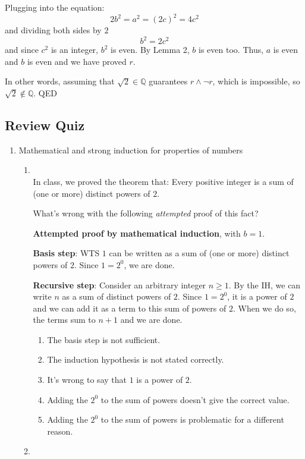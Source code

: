\documentclass[12pt, oneside]{article}
\begin{document}
Plugging into the equation:
\[
    2b^2 = a^2 = (2c)^2 = 4c^2
\]
and dividing both sides by $2$
\[
    b^2 = 2c^2
\]
and since $c^2$ is an integer, $b^2$ is even. By Lemma 2, $b$ is even too.
Thus, $a$ is even and $b$ is even and we have proved $r$. 

In other words, assuming that $\sqrt{2} \in \mathbb{Q}$ guarantees $r \land \lnot r$, 
which is impossible, so $\sqrt{2} \notin \mathbb{Q}$. QED

 

\newpage

\subsection*{Review Quiz}
\begin{enumerate}
    \item Mathematical and strong induction for properties of numbers
    \begin{enumerate}
        \item \hspace{1in} \\ 

In class, we proved the theorem that: 
Every positive integer is a sum of (one or more) distinct powers of $2$.

What's wrong with the following {\it attempted} proof of this fact?


{\bf Attempted proof by mathematical induction}, with $b=1$.

{\bf Basis step}: WTS $1$ can be written 
as a sum of (one or more) distinct powers of $2$. Since $1 =2^0$, 
we are done.

{\bf Recursive step}: Consider an arbitrary integer $n \geq 1$.
By the IH, we can write $n$ as a sum of distinct powers of $2$.
Since $1 = 2^0$, it is a power of $2$ and we can add it as a term 
to this sum of powers of $2$. When we do so, the terms sum to $n+1$
and we are done.

\begin{enumerate}
\item The basis step is not sufficient.
\item The induction hypothesis is not stated correctly.
\item It's wrong to say that $1$ is a power of $2$.
\item Adding the $2^0$ to the sum of powers doesn't give the correct value.
\item Adding the $2^0$ to the sum of powers 
is problematic for a different reason.
\end{enumerate}
         \item \hspace{1in} \\ 


\end{enumerate}
\end{enumerate}
\end{document}
